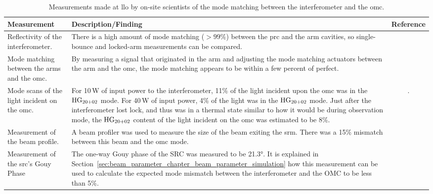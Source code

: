 \begin{table}[h]
	\centering
	\begin{tabular}{|p{25mm} | p{75mm} | c |}
		\hline
		Measurement & Description/Finding & Reference \\
		\hline
		\hline
		Reflectivity of the interferometer. & There is a high amount of mode matching ($>99\%$) between the \gls{prc} and the arm cavities, so single-bounce and locked-arm measurements can be compared. & \cite{interferometer_reflectivity_2019}\\
		\hline
		Mode matching between the arms and the \gls{omc}. & By measuring a signal that originated in the arm and adjusting the mode matching actuators between the arm and the \gls{omc}, the mode matching appears to be within a few percent of perfect. &  \cite{SRM_CO2_chop,CO2_mode_matching_2019} \\
		\hline
		Mode scans of the light incident on the \gls{omc}. & For 10\,W of input power to the interferometer, 11\% of the light incident upon the \gls{omc} was in the $\rm{HG}_{20+02}$ mode. For 40\,W of input power, 4\% of the light was in the $\rm{HG}_{20+02}$ mode. Just after the interferometer lost lock, and thus was in a thermal state similar to how it would be during observation mode, the $\rm{HG}_{20+02}$ content of the light incident on the \gls{omc} was estimated to be 8\%. & \cite{10W_omc_scans_2018,40W_scans_2019,cooling_omc_scan_2018}. \\
		\hline
		Measurement of the beam profile. & A beam profiler was used to measure the size of the beam exiting the \gls{srm}. There was a 15\% mismatch between this beam and the \gls{omc} mode. &\cite{llo_beam_profile_alog_2018,llo_beam_profile_dcc_2018} \\  
		\hline
		Measurement of the \gls{src}'s Gouy Phase & The one-way Gouy phase of the SRC was measured to be 21.3\si{\degree}. It is explained in Section~\ref{sec:beam_parameter_chapter_beam_parameter_simulation} how this measurement can be used to calculate the expected mode mismatch between the interferometer and the OMC to be less than 5\%. & \cite{SRC_gouy_phase_meas_2018} \\
		\hline
	\end{tabular}
\caption[Summary of mode matching measurements made at LIGO Livingston by on-site scientist.]{Measurements made at \gls{llo} by on-site scientists of the mode matching between the interferometer and the \gls{omc}.}
\label{tab:src_chapter_measaurements}
\end{table}
